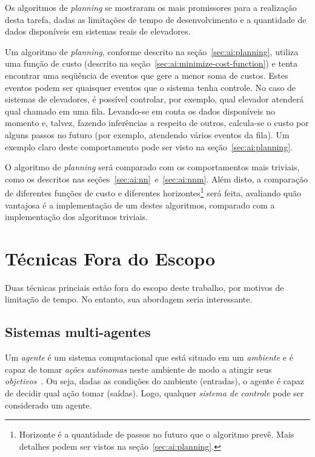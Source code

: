 Os algoritmos de \textit{planning} se mostraram os mais promissores para a
realização desta tarefa, dadas as limitações de tempo de desenvolvimento e a
quantidade de dados disponíveis em sistemas reais de elevadores.

Um algoritmo de \textit{planning}, conforme descrito na
seção~\ref{sec:ai:planning}, utiliza uma função de custo (descrito na
seção~\ref{sec:ai:minimize-cost-function}) e tenta encontrar uma seqüência de
eventos que gere a menor soma de custos. Estes eventos podem ser quaisquer
eventos que o sistema tenha controle. No caso de sistemas de elevadores, é
possível controlar, por exemplo, qual elevador atenderá qual chamado em uma
fila. Levando-se em conta os dados disponíveis no momento e, talvez, fazendo
inferências a respeito de outros, calcula-se o custo por alguns passos no futuro
(por exemplo, atendendo vários eventos da fila). Um exemplo claro deste
comportamento pode ser visto na seção~\ref{sec:ai:planning}.

O algoritmo de \textit{planning} será comparado com os comportamentos mais
triviais, como os descritos nas seções~\ref{sec:ai:nn}~e~\ref{sec:ai:nnm}. Além
disto, a comparação de diferentes funções de custo e diferentes
horizontes\footnote{Horizonte é a quantidade de passos no futuro que o algoritmo
prevê. Mais detalhes podem ser vistos na seção~\ref{sec:ai:planning}.} será
feita, avaliando quão vantajosa é a implementação de um destes algoritmos,
comparado com a implementação dos algoritmos triviais.

\section{\label{sec:proposal:out-of-scope}Técnicas Fora do Escopo}

Duas técnicas princiais estão fora do escopo deste trabalho, por motivos de
limitação de tempo. No entanto, sua abordagem seria interessante.

\subsection{\label{section:multiagentes}Sistemas multi-agentes}

Um \textit{agente} é um sistema computacional que está situado em um \textit{ambiente} e é capaz de tomar \textit{ações autônomas} neste ambiente de modo a atingir seus \textit{objetivos}~\cite{Woolridge:2001:IMS:559667}. Ou seja, dadas as condições do ambiente (entradas), o agente é capaz de decidir qual ação tomar (saídas). Logo, qualquer \textit{sistema de controle} pode ser considerado um agente.


